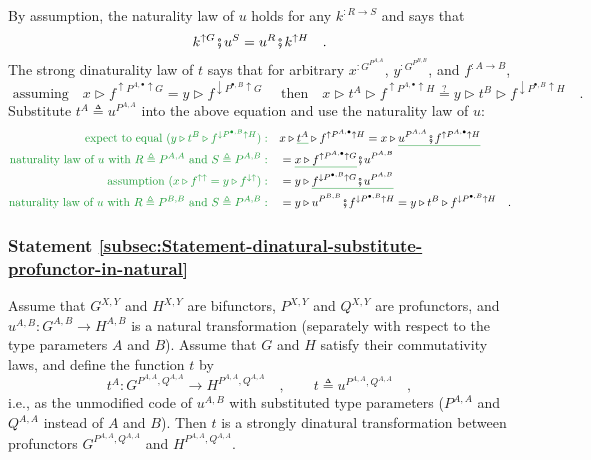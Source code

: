 By assumption, the naturality law of $u$ holds for any $k^{:R\rightarrow S}$
and says that
\[
k^{\uparrow G}\bef u^{S}=u^{R}\bef k^{\uparrow H}\quad.
\]
The strong dinaturality law of $t$ says that for arbitrary $x^{:G^{P^{A,A}}}$,
$y^{:G^{P^{B,B}}}$, and $f^{:A\rightarrow B}$,
\[
\text{ assuming}\quad x\triangleright f^{\uparrow P^{A,\bullet}\uparrow G}=y\triangleright f^{\downarrow P^{\bullet,B}\uparrow G}\quad\text{ then}\quad x\triangleright t^{A}\triangleright f^{\uparrow P^{A,\bullet}\uparrow H}\overset{?}{=}y\triangleright t^{B}\triangleright f^{\downarrow P^{\bullet,B}\uparrow H}\quad.
\]
Substitute $t^{A}\triangleq u^{P^{A,A}}$ into the above equation
and use the naturality law of $u$:
\begin{align*}
{\color{greenunder}\text{expect to equal }(y\triangleright t^{B}\triangleright f^{\downarrow P^{\bullet,B}\uparrow H}):}\quad & x\triangleright\gunderline{t^{A}}\triangleright f^{\uparrow P^{A,\bullet}\uparrow H}=x\triangleright\gunderline{u^{P^{A,A}}\bef f^{\uparrow P^{A,\bullet}\uparrow H}}\\
{\color{greenunder}\text{naturality law of }u\text{ with }R\triangleq P^{A,A}\text{ and }S\triangleq P^{A,B}:}\quad & =\gunderline{x\triangleright f^{\uparrow P^{A,\bullet}\uparrow G}}\bef u^{P^{A,B}}\\
{\color{greenunder}\text{assumption }(x\triangleright f^{\uparrow\uparrow}=y\triangleright f^{\downarrow\uparrow}):}\quad & =y\triangleright\gunderline{f^{\downarrow P^{\bullet,B}\uparrow G}\bef u^{P^{A,B}}}\\
{\color{greenunder}\text{naturality law of }u\text{ with }R\triangleq P^{B,B}\text{ and }S\triangleq P^{A,B}:}\quad & =y\triangleright u^{P^{B,B}}\bef f^{\downarrow P^{\bullet,B}\uparrow H}=y\triangleright t^{B}\triangleright f^{\downarrow P^{\bullet,B}\uparrow H}\quad.
\end{align*}


\subsubsection{Statement \label{subsec:Statement-dinatural-substitute-profunctor-in-natural}\ref{subsec:Statement-dinatural-substitute-profunctor-in-natural}}

Assume that $G^{X,Y}$ and $H^{X,Y}$ are bifunctors, $P^{X,Y}$ and
$Q^{X,Y}$ are profunctors, and $u^{A,B}:G^{A,B}\rightarrow H^{A,B}$
is a natural transformation (separately with respect to the type parameters
$A$ and $B$). Assume that $G$ and $H$ satisfy their commutativity
laws, and define the function $t$ by
\[
t^{A}:G^{P^{A,A},Q^{A,A}}\rightarrow H^{P^{A,A},Q^{A,A}}\quad,\quad\quad t\triangleq u^{P^{A,A},Q^{A,A}}\quad,
\]
i.e., as the unmodified code of $u^{A,B}$ with substituted type parameters
($P^{A,A}$ and $Q^{A,A}$ instead of $A$ and $B$). Then $t$ is
a strongly dinatural transformation between profunctors $G^{P^{A,A},Q^{A,A}}$
and $H^{P^{A,A},Q^{A,A}}$.


